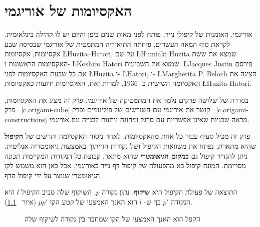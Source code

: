 


\chapter{האקסיומות של אוריגמי}\label{c.origami-axioms}

אוריגמי, האומנות של קיפולי נייר, פותח לפני מאות שנים ביפן והיום יש לו קהילה בינלאומית. לקראת סוף המאה העשרים, פוחתה התיאוריה המתמטית של אוריגמי שבסיסה שבע אקסיומות, אקסיומות
\L{Huzita–Hatori},
על שם
\L{Humiaki Huzita}
שמצא את ששת האקסיומות הראשונות ו-%
\L{Koshiro Hatori}
שמצא את השביעית.
\L{Jacques Justin}
פירסם את כל שבעת האקסיומות לפני
\L{Huzita}
ו-%
\L{Hatori},
ו-%
\L{Margherita P. Beloch}
הציגה את האקסיומה השישית ב-%
$1936$.
למרות זאת, האקסיומות ידועות כאקסיומות
\L{Huzita-Hatori}.

בסדרה של שלושה פרקים נלמד את המתמטיקה של אוריגמי. פרק זה מציג את האקסיומות, פרק%
~\ref{c.origami-cube}
קושר את אוריגמי עם השורשים של פולינומים ופרק%
~\ref{c.origami-constructions} 
מראה שבניות שאינן אפשריות עם סרגל ומחוגה ניתנות לבנייה עם אוריגמי.
 
פרק זה מכיל סעיף עבור כל אחת מהאקסיומות. לאחר ניסוח האקסיומה ותרשים של 
\textbf{הקיפול}
שהיא מתארת, נפתח את משוואות הקיפול ושל נקודות החיתוך באמצעות גיאומטריה אנליטית. ניתן להגדיר קיפול גם 
\textbf{כמקום הגיאומטרי}
שהוא מתאר, קבוצת כל הנקודות המקיימות תכונה מסויימת. המונח קיפול בא מהפעולה של קיפול דף נייר באוריגמי, אבל כאן הוא משמש לקו הגיאומטרי שנוצר על ידי קיפול הדף.

התוצאה של פעולת הקיפול היא
\textbf{שיקוף}.
נתון נקודה
$p$,
השיקוף שלה סביב הקיפול
$l$
היא הנקודה 
$p'$
כך ש-%
$l$
הוא האנך האמצעי של קטע הקו
$\overline{pp'}$
(איור%
~\ref{f.origami-def}).
\begin{figure}[tb]
\begin{center}
\end{center}
\caption{הקפל הוא האנך האמצעי של הקו שמחבר בין נקודה לשיקוף שלה}
\label{f.origami-def}
\end{figure}

